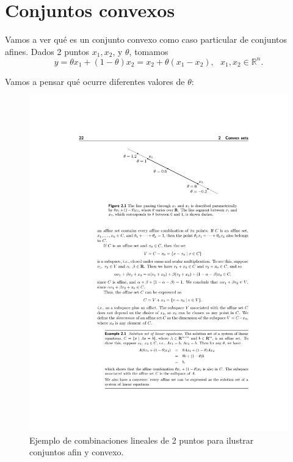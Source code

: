 

\section{Conjuntos convexos}

Vamos a ver qué es un conjunto convexo como caso particular de conjuntos afines.  
Dados 2 puntos $x_1,x_2$, y $\theta$, tomamos 
\[
y = \theta x_1 + (1-\theta)x_2 = x_2 + \theta (x_1-x_2),\ \ \  x_1,x_2\in\mathbb{R}^n.
\]

Vamos a pensar qué ocurre diferentes valores de $\theta$:


\begin{figure}
\begin{center}
\includegraphics[scale=0.8]{pdf/berrendero/tema2/_combinacion}
\caption{Ejemplo de combinaciones lineales de 2 puntos para ilustrar conjuntos afin y convexo.}
\label{sec2:comb}
\end{center}
\end{figure}


